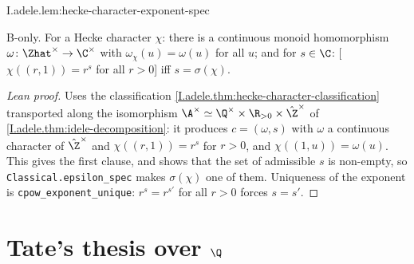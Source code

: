 \begin{lemma}
\bonly
{}
\end{lemma}
\begin{tfformal}{I.adele.lem:hecke-character-exponent-spec}
\begin{tffidelity}
B-only. For a Hecke character $\chi$: there is a continuous monoid homomorphism $\omega\colon\Zhat^\times\to\C^\times$ with $\omega_\chi(u)=\omega(u)$ for all $u$; and for $s\in\C$: [$\chi((r,1))=r^s$ for all $r>0$] iff $s=\sigma(\chi)$.
\end{tffidelity}
\end{tfformal}
\begin{proof}[Lean proof]
Uses the classification \cref{I.adele.thm:hecke-character-classification} transported along the isomorphism $\A^\times\simeq\Q^\times\times\R_{>0}\times\hat\Z^\times$ of \cref{I.adele.thm:idele-decomposition}: it produces $c=(\omega,s)$ with $\omega$ a continuous character of $\hat\Z^\times$ and $\chi((r,1))=r^s$ for $r>0$, and $\chi((1,u))=\omega(u)$. This gives the first clause, and shows that the set of admissible $s$ is non-empty, so \texttt{Classical.epsilon\_spec} makes $\sigma(\chi)$ one of them. Uniqueness of the exponent is \texttt{cpow\_exponent\_unique}: $r^s=r^{s'}$ for all $r>0$ forces $s=s'$.
\end{proof}

\section{\texorpdfstring{Tate's thesis over $\Q$}{Tate's thesis over ℚ}}


